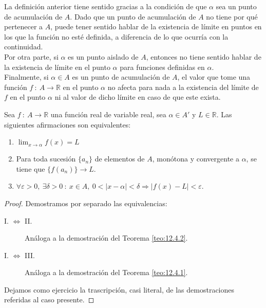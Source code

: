 La definición anterior tiene sentido gracias a la condición de que $\alpha$ sea un punto de acumulación de $A$.
Dado que un punto de acumulación de $A$ no tiene por qué pertenecer a $A$, puede tener sentido hablar de la existencia de límite en puntos en los que la función no esté definida, a diferencia de lo que ocurría con la continuidad.\\

Por otra parte, si $\alpha$ es un punto aislado de $A$, entonces no tiene sentido hablar de la existencia de límite en el punto $\alpha$ para funciones definidas en $\alpha$.\\

Finalmente, si $\alpha \in A$ es un punto de acumulación de $A$, el valor que tome una función $f ~:~ A \longrightarrow \mathbb{R}$ en el punto $\alpha$ no afecta para nada a la existencia del límite de $f$ en el punto $\alpha$ ni al valor de dicho límite en
caso de que este exista.

\begin{teo}\label{teo:13.1.4}
    Sea $f ~:~ A \longrightarrow \mathbb{R}$ una función real de variable real, sea $\alpha \in A'$ y $L \in \mathbb{R}$.
    Las siguientes afirmaciones son equivalentes:
    \begin{enumerate}
        \item $\displaystyle\lim_{x \to \alpha} f(x) = L$

        \item Para toda sucesión $\{a_n\}$ de elementos de $A$, monótona y convergente a $\alpha$, se tiene que $\{f(a_n)\}\longrightarrow L$.

        \item $\forall \varepsilon > 0, ~ \exists \delta > 0 ~:~ x \in A, ~ 0 < |x-\alpha| < \delta \Longrightarrow |f(x)-L| < \varepsilon$.
    \end{enumerate}
\end{teo}
\begin{proof} Demostramos por separado las equivalencias:
    \begin{description}
        \item[I. $\Longleftrightarrow$ II.] Análoga a la demostración del Teorema \ref{teo:12.4.2}.

        \item[I. $\Longleftrightarrow$ III.] Análoga a la demostración del Teorema \ref{teo:12.4.1}.
    \end{description}

    Dejamos como ejercicio la trascripción, casi literal, de las demostraciones referidas al caso presente.
\end{proof}

